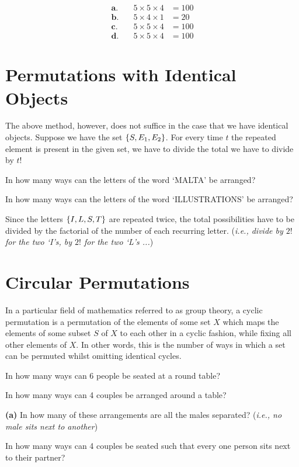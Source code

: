 	\begin{align*}
	{\textbf{a.}} \quad & 5\times5\times4 & = 100 \\
	{\textbf{b.}} \quad & 5\times4\times1 & = 20  \\
	{\textbf{c.}} \quad & 5\times5\times4 & = 100 \\
	{\textbf{d.}} \quad & 5\times5\times4 & = 100 
	\end{align*}
	\section{Permutations with Identical Objects}
	The above method, however, does not suffice in the case that we have identical objects. Suppose we have the set $\set{S,E_1,E_2}$. For every time $t$ the repeated element is present in the given set, we have to divide the total we have to divide by $t!$
	\begin{example}
		In how many ways can the letters of the word `MALTA' be arranged?
	\end{example}
	
	\begin{example}
		In how many ways can the letters of the word `ILLUSTRATIONS' be arranged?
	\end{example}
Since the letters $\set{I,L,S,T}$ are repeated twice, the total possibilities have to be divided by the factorial of the number of each recurring letter. (\textit{i.e., divide by $2!$ for the two `I's, by $2!$ for the two `L's ...})

	\section{Circular Permutations}
	In a particular field of mathematics referred to as group theory, a cyclic permutation is a permutation of the elements of some set $X$ which maps the elements of some subset $S$ of $X$ to each other in a cyclic fashion, while fixing all other elements of $X$. In other words, this is the number of ways in which a set can be permuted whilst omitting identical cycles.
	\begin{example}
		In how many ways can 6 people be seated at a round table?
	\end{example}

\begin{example}
	In how many ways can 4 couples be arranged around a table?
	
	\quad\textbf{(a)} In  how many of these arrangements are all the males separated? (\textit{i.e., no male sits next to another})
	\end{example}
\begin{example}
	In how many ways can 4 couples be seated such that every one person sits next to their partner?
\end{example}
